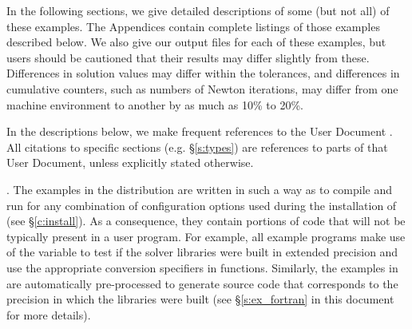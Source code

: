 \vspace{0.2in}\noindent 
In the following sections, we give detailed descriptions of some (but
not all) of these examples.  The Appendices contain complete listings
of those examples described below.  We also give our output files for
each of these examples, but users should be cautioned that their
results may differ slightly from these.  Differences in solution
values may differ within the tolerances, and differences in cumulative
counters, such as numbers of Newton iterations, may differ
from one machine environment to another by as much as 10\% to 20\%.

In the descriptions below, we make frequent references to the {\kinsol}
User Document \cite{kinsol_ug}.  All citations to specific sections
(e.g. \S\ref{s:types}) are references to parts of that User Document, unless
explicitly stated otherwise.

\vspace{0.2in}. 
The examples in the {\kinsol} distribution are written in such a way as
to compile and run for any combination of configuration options used during
the installation of {\sundials} (see \S\ref{c:install}). As a consequence,
they contain portions of code that will not be typically present in a
user program. For example, all {\C} example programs make use of the
variable  to test if the solver libraries
were built in extended precision and use the appropriate conversion 
specifiers in  functions. Similarly, the {\F} examples in
{\fkinsol} are automatically pre-processed to generate source code that
corresponds to the precision in which the {\kinsol} libraries were built
(see \S\ref{s:ex_fortran} in this document for more details).

